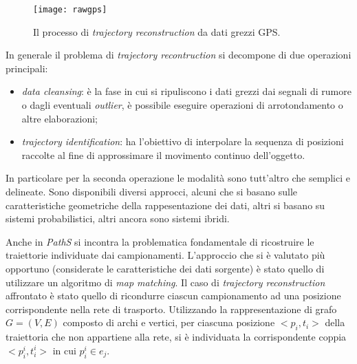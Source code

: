 \begin{figure}[h]
  \centering
  \texttt{[image: rawgps]}
  \caption{\footnotesize{Il processo di \emph{trajectory reconstruction} da dati grezzi GPS.}}
  \label{fig:rawgps}
\end{figure}

In generale il problema di \emph{trajectory recontruction} si decompone di due operazioni principali:
\begin{itemize}
\item \emph{data cleansing}: è la fase in cui si ripuliscono i dati grezzi dai segnali di rumore o dagli eventuali \emph{outlier}, è possibile eseguire operazioni di arrotondamento o altre elaborazioni;
\item \emph{trajectory identification}: ha l'obiettivo di interpolare la sequenza di posizioni raccolte al fine di approssimare il movimento continuo dell'oggetto.
\end{itemize}
In particolare per la seconda operazione le modalità sono tutt'altro che semplici e delineate. Sono disponibili diversi approcci, alcuni che si basano sulle caratteristiche geometriche della rappesentazione dei dati, altri si basano su sistemi probabilistici, altri ancora sono sistemi ibridi.

Anche in \emph{PathS} si incontra la problematica fondamentale di ricostruire le traiettorie individuate dai campionamenti. L'approccio che si è valutato più opportuno (considerate le caratteristiche dei dati sorgente) è stato quello di utilizzare un algoritmo di \emph{map matching}.
Il caso di \emph{trajectory reconstruction} affrontato è stato quello di ricondurre ciascun campionamento ad una posizione corrispondente nella rete di trasporto. Utilizzando la rappresentazione di grafo $G=(V,E)$ composto di archi e vertici, per ciascuna posizione $<p_i, t_i>$ della traiettoria che non appartiene alla rete, si è individuata la corrispondente coppia $<p_i^i, t_i^i>$ in cui $p_i^i \in e_j$.

